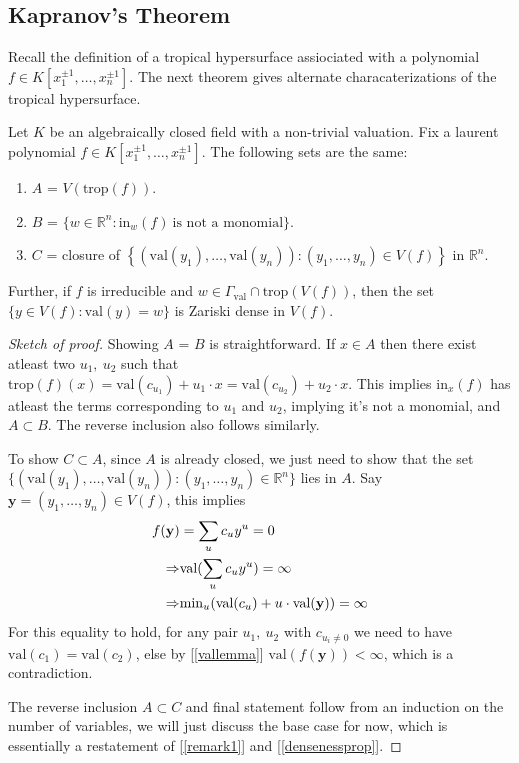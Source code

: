     \subsection{Kapranov's Theorem}
    Recall the definition of a tropical hypersurface assiociated with a polynomial $f \in K[x_{1}^{\pm1}, \dots, x_{n}^{\pm1}]$.
    The next theorem gives alternate characaterizations of the tropical hypersurface.
    \begin{theorem}
    Let $K$ be an algebraically closed field with a non-trivial valuation. Fix a laurent polynomial $f \in K[x_{1}^{\pm1}, \dots, x_{n}^{\pm1}]$. The following sets are the same:
    \begin{enumerate}
        \item $A$ = $V(\text{trop}(f))$.
        \item $B$ = $\{w \in \mathbb{R}^{n}: \text{in}_{w}(f)~ \text{is not a monomial}\}$.
        \item $C$ = closure of $\left\{(\text{val}(y_1), \dots, \text{val}(y_n)): (y_1,\dots, y_n) \in V(f)\right\}$ in $\mathbb{R}^{n}$.
    \end{enumerate}
    Further, if $f$ is irreducible and $w \in \Gamma_{\text{val}} \cap \text{trop}(V(f))$, then the set $\{y \in V(f): \text{val}(y) = w\}$ is Zariski dense in $V(f)$.
    \end{theorem}
    \begin{proof}[Sketch of proof]
        Showing $A$ = $B$ is straightforward. 
        If $x \in A$ then there exist atleast two $u_1,~u_2$ such that $\text{trop}(f)(x) = \text{val}(c_{u_{1}}) + u_{1}\cdot x = \text{val}(c_{u_{2}}) + u_{2}\cdot x$. 
        This implies $\text{in}_{x}(f)$ has atleast the terms corresponding to $u_1$ and $u_2$, implying it's not a monomial, and $A \subset B$. The reverse inclusion also follows similarly. 
        \par To show $C \subset A$, since $A$ is already closed, we just need to show that the set $\{(\text{val}(y_1), \dots, \text{val}(y_n)): (y_1,\dots, y_n) \in \mathbb{R}^{n}\}$ lies in $A$. Say $\textbf{y} = (y_1,\dots,y_n) \in V(f)$, this implies 
        \begin{align*}
            f(\textbf{y}) &= \sum_u c_u y^{u} = 0 \\
            \Rightarrow&\text{val}(\sum_u c_u y^{u}) = \infty \\
            \Rightarrow& \text{min}_u(\text{val}(c_u) + u \cdot \text{val(\textbf{y})}) = \infty
        \end{align*}
        For this equality to hold, for any pair $u_{1},~u_{2}$ with $c_{u_{i} \neq 0}$ we need to have $\text{val}(c_1) = \text{val}(c_2)$, else by [\ref{vallemma}] $\text{val}(f(\textbf{y})) < \infty$, which is a contradiction. 
        \par The reverse inclusion $A \subset C$ and final statement follow from an induction on the number of variables, we will just discuss the base case for now, which is essentially a restatement of [\ref{remark1}] and [\ref{densenessprop}].
    \end{proof}
